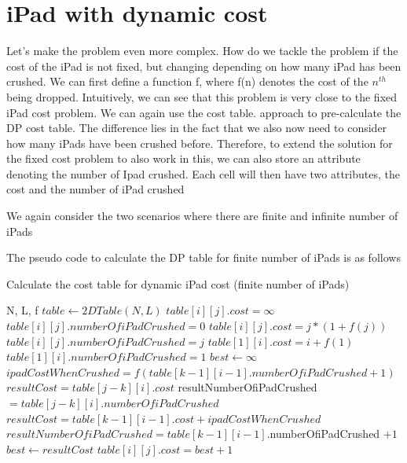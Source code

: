 \documentclass[12pt,a4paper,oneside]{report}
\begin{document}
\section{iPad with dynamic cost}
Let's make the problem even more complex. How do we tackle the problem if the cost of the iPad is not fixed, but changing depending on how many iPad has been crushed. 
We can first define a function f, where f(n) denotes the cost of the $n^{th}$ being dropped.
Intuitively, we can see that this problem is very close to the fixed iPad cost problem. We can again use the cost table. approach to pre-calculate the DP cost table. The difference lies in the fact that we also now need to consider how many iPads have been crushed before.
Therefore, to extend the solution for the fixed cost problem to also work in this, we can also store an attribute denoting the number of Ipad crushed. Each cell will then have two attributes, the cost and the number of iPad crushed

We again consider the two scenarios where there are finite and infinite number of iPads

The pseudo code to calculate the DP table for finite number of iPads is as follows

\begin{algorithm}[H]
\caption{Calculate the cost table for dynamic iPad cost (finite number of iPads)}
\begin{algorithmic}[1]
\REQUIRE N, L, f
\STATE $table \leftarrow 2DTable(N, L)$
		\STATE $table[i][j].cost = \infty$
		\STATE $table[i][j].numberOfiPadCrushed = 0$
	\ENDFOR
\ENDFOR
{}
		\STATE $table[i][j].cost = j*(1 + f(j))$
		\STATE $table[i][j].numberOfiPadCrushed = j$
	\ENDFOR
\ENDFOR
{}
	\STATE $table[1][i].cost = i + f(1)$
	\STATE $table[1][i].numberOfiPadCrushed = 1$
\ENDFOR
{}
		\STATE $best \leftarrow \infty$
			\STATE $ipadCostWhenCrushed =  f(table[k-1][i-1].numberOfiPadCrushed +1)$
				\STATE $resultCost= table[j-k][i].cost$
				\STATE resultNumberOfiPadCrushed $= table[j-k][i].numberOfiPadCrushed$
			\ELSE
				\STATE $resultCost= table[k-1][i-1].cost + ipadCostWhenCrushed$
				\STATE $resultNumberOfiPadCrushed = table[k-1][i-1].$numberOfiPadCrushed $+ 1$	
			\ENDIF
				\STATE $best \leftarrow resultCost$
			\ENDIF
		\ENDFOR
		\STATE $table[i][j].cost = best + 1$
	\ENDFOR
\ENDFOR
\end{algorithmic}
\end{algorithm}
\end{document}

